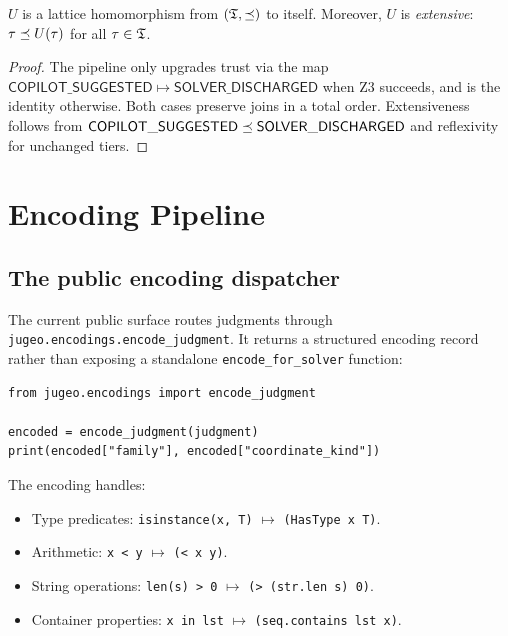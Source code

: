 \documentclass[11pt]{article}
\newcommand{\CopilotSugg}{\ensuremath{\mathsf{COPILOT\_SUGGESTED}}}
\newcommand{\SolverDisch}{\ensuremath{\mathsf{SOLVER\_DISCHARGED}}}
\begin{document}
\begin{theorem}\label{thm:homo-correct}
$U$ is a lattice homomorphism from $(\mathfrak{T}, \preceq)$ to itself.
Moreover, $U$ is \emph{extensive}: $\tau \preceq U(\tau)$ for all
$\tau \in \mathfrak{T}$.
\end{theorem}

\begin{proof}
The pipeline only upgrades trust via the map $\CopilotSugg \mapsto
\SolverDisch$ when Z3 succeeds, and is the identity otherwise.  Both
cases preserve joins in a total order.  Extensiveness follows from
$\CopilotSugg \tleq \SolverDisch$ and reflexivity for unchanged tiers.
\end{proof}

\section{Encoding Pipeline}\label{sec:encoding}

\subsection{The public encoding dispatcher}
The current public surface routes judgments through
\texttt{jugeo.encodings.encode\_judgment}.  It returns a structured
encoding record rather than exposing a standalone
\texttt{encode\_for\_solver} function:

\begin{lstlisting}[style=jugeo-python]
from jugeo.encodings import encode_judgment

encoded = encode_judgment(judgment)
print(encoded["family"], encoded["coordinate_kind"])
\end{lstlisting}

The encoding handles:
\begin{itemize}[noitemsep]
  \item Type predicates: \texttt{isinstance(x, T)} $\mapsto$ 
        \texttt{(HasType x T)}.
  \item Arithmetic: \texttt{x < y} $\mapsto$ \texttt{(< x y)}.
  \item String operations: \texttt{len(s) > 0} $\mapsto$ 
        \texttt{(> (str.len s) 0)}.
  \item Container properties: \texttt{x in lst} $\mapsto$ 
        \texttt{(seq.contains lst x)}.
\end{itemize}
\end{document}
